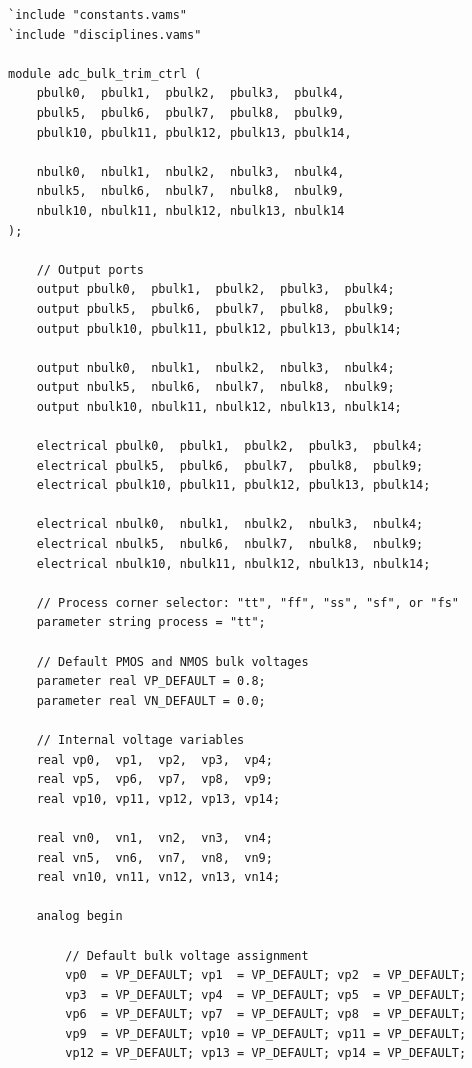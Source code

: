 \begin{lstlisting}[style=verilogA, caption={Verilog-A model of the per-slicer body bias trimming controller.}, label={lst:veriloga}]
`include "constants.vams"
`include "disciplines.vams"

module adc_bulk_trim_ctrl (
    pbulk0,  pbulk1,  pbulk2,  pbulk3,  pbulk4,
    pbulk5,  pbulk6,  pbulk7,  pbulk8,  pbulk9,
    pbulk10, pbulk11, pbulk12, pbulk13, pbulk14,

    nbulk0,  nbulk1,  nbulk2,  nbulk3,  nbulk4,
    nbulk5,  nbulk6,  nbulk7,  nbulk8,  nbulk9,
    nbulk10, nbulk11, nbulk12, nbulk13, nbulk14
);

    // Output ports
    output pbulk0,  pbulk1,  pbulk2,  pbulk3,  pbulk4;
    output pbulk5,  pbulk6,  pbulk7,  pbulk8,  pbulk9;
    output pbulk10, pbulk11, pbulk12, pbulk13, pbulk14;

    output nbulk0,  nbulk1,  nbulk2,  nbulk3,  nbulk4;
    output nbulk5,  nbulk6,  nbulk7,  nbulk8,  nbulk9;
    output nbulk10, nbulk11, nbulk12, nbulk13, nbulk14;

    electrical pbulk0,  pbulk1,  pbulk2,  pbulk3,  pbulk4;
    electrical pbulk5,  pbulk6,  pbulk7,  pbulk8,  pbulk9;
    electrical pbulk10, pbulk11, pbulk12, pbulk13, pbulk14;

    electrical nbulk0,  nbulk1,  nbulk2,  nbulk3,  nbulk4;
    electrical nbulk5,  nbulk6,  nbulk7,  nbulk8,  nbulk9;
    electrical nbulk10, nbulk11, nbulk12, nbulk13, nbulk14;

    // Process corner selector: "tt", "ff", "ss", "sf", or "fs"
    parameter string process = "tt";

    // Default PMOS and NMOS bulk voltages
    parameter real VP_DEFAULT = 0.8;
    parameter real VN_DEFAULT = 0.0;

    // Internal voltage variables
    real vp0,  vp1,  vp2,  vp3,  vp4;
    real vp5,  vp6,  vp7,  vp8,  vp9;
    real vp10, vp11, vp12, vp13, vp14;

    real vn0,  vn1,  vn2,  vn3,  vn4;
    real vn5,  vn6,  vn7,  vn8,  vn9;
    real vn10, vn11, vn12, vn13, vn14;

    analog begin

        // Default bulk voltage assignment
        vp0  = VP_DEFAULT; vp1  = VP_DEFAULT; vp2  = VP_DEFAULT;
        vp3  = VP_DEFAULT; vp4  = VP_DEFAULT; vp5  = VP_DEFAULT;
        vp6  = VP_DEFAULT; vp7  = VP_DEFAULT; vp8  = VP_DEFAULT;
        vp9  = VP_DEFAULT; vp10 = VP_DEFAULT; vp11 = VP_DEFAULT;
        vp12 = VP_DEFAULT; vp13 = VP_DEFAULT; vp14 = VP_DEFAULT;


\end{lstlisting}
